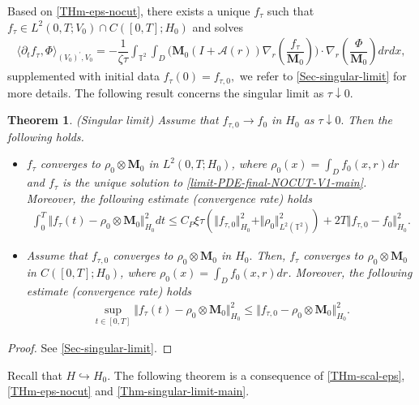 \documentclass[a4paper,12pt, reqno]{amsart}
\newtheorem{theorem}{Theorem}
\newcommand{\M}{\mathbf{M}}
\begin{document}
 Based on \autoref{THm-eps-nocut}, there exists  a unique $f_\tau$ such that   $f_\tau \in L^2(0, T;V_0) \cap C([0, T];H_0)$    and  solves
        \begin{align}\label{limit-PDE-final-NOCUT-V1-main}
    \langle\partial_t f_\tau,\Phi\rangle_{(V_0)^\prime,V_0}=- \dfrac{1}{\zeta \tau}\int_{\mathbb{T}^2}\int_D\bigl(\mathbf{M}_0 (I+\mathcal{A}(r))\nabla_r(\dfrac{f_\tau}{\mathbf{M}_0})\bigr)\cdot \nabla_r\left(\dfrac{\Phi}{\mathbf{M}_0}\right) drdx,
\end{align}
supplemented with initial data  $f_\tau(0)=f_{\tau,0},$ we refer to \autoref{Sec-singular-limit} for more details. The following result concerns the singular limit as $\tau\downarrow 0.$
 \begin{theorem}\label{Thm-singular-limit-main}(Singular limit)
    Assume that $f_{\tau, 0} \to f_0$ in $H_0$ as $\tau \downarrow 0.$ Then the following  holds.
    \begin{itemize}
        \item $ f_\tau$ converges to 
        $ \rho_0\otimes \M_0$ in $L^2(0,T;H_0)$, 
     where  $\rho_0(x)=\int_D f_0(x,r) dr$ and $f_\tau$ is the unique solution  to \eqref{limit-PDE-final-NOCUT-V1-main}. Moreover, the following estimate (convergence rate) holds
              \begin{align}\label{ineq-converg-equi-Main}
 \int_0^T  \Vert f_{\tau}(t)-\rho_0\otimes \mathbf{M}_0\Vert_{H_0}^2 dt \leq C_P  \xi\tau (\Vert f_{\tau, 0}\Vert_{H_0}^2+\Vert \rho_0 \Vert^2_{L^2(\mathbb{T}^2)})+2T\Vert f_{\tau,0}-f_0\Vert_{H_0}^2.
          \end{align}
          \item Assume that $f_{\tau,0}$ converges to $ \rho_{0}\otimes\mathbf{M}_0$ in $H_0.$ Then,  $ f_\tau$ converges to 
        $ \rho_0\otimes \M_0$ in $C([0,T];H_0)$, 
     where  $\rho_0(x)=\int_D f_0(x,r) dr$. Moreover, the following estimate (convergence rate) holds
     \begin{align}\label{ineq-conv-equi-Cont-Main}
         \displaystyle\sup_{t\in [0,T]}\Vert f_{\tau}(t)-\rho_0\otimes \mathbf{M}_0\Vert_{H_0}^2 \leq   \Vert f_{\tau,0}- \rho_{0}\otimes\mathbf{M}_0\Vert_{H_0}^2.
     \end{align}
    \end{itemize}
\end{theorem}
\begin{proof}
    See \autoref{Sec-singular-limit}.
\end{proof}
Recall that $H\hookrightarrow H_0.$
The following theorem is a consequence of \autoref{THm-scal-eps},  \autoref{THm-eps-nocut} and \autoref{Thm-singular-limit-main}.
\end{document}
